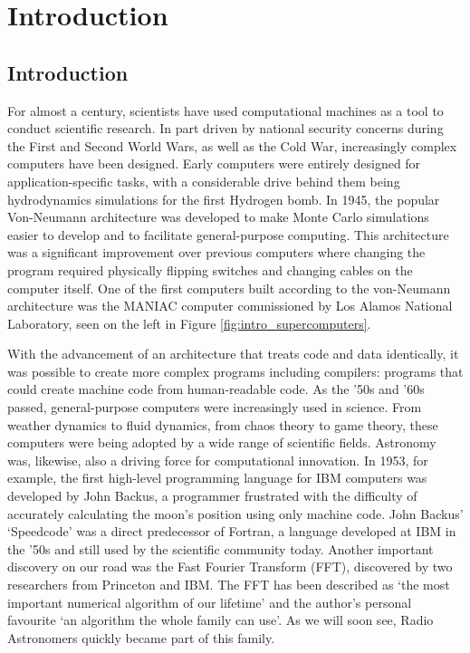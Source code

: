 \chapter{Introduction}

\section{Introduction}\label{sec:intro_intro}

For almost a century, scientists have used computational machines as a tool to conduct scientific research. In part driven by national security concerns during the First and Second World Wars, as well as the Cold War, increasingly complex computers have been designed. Early computers were entirely designed for application-specific tasks, with a considerable drive behind them being hydrodynamics simulations for the first Hydrogen bomb. In 1945, the popular Von-Neumann\citep{Neumann:1945:FDR:1102046} architecture was developed to make Monte Carlo simulations easier to develop and to facilitate general-purpose computing. This architecture was a significant improvement over previous computers where changing the program required physically flipping switches and changing cables on the computer itself. One of the first computers built according to the von-Neumann architecture was the MANIAC\citep{wood1985early} computer commissioned by Los Alamos National Laboratory, seen on the left in Figure \ref{fig:intro_supercomputers}.

With the advancement of an architecture that treats code and data identically, it was possible to create more complex programs including compilers: programs that could create machine code from human-readable code. As the '50s and '60s passed, general-purpose computers were increasingly used in science. From weather dynamics\citep{lorenz1956empirical} to fluid dynamics\citep{harlow1965numerical}, from chaos theory to game theory, these computers were being adopted by a wide range of scientific fields. Astronomy was, likewise, also a driving force for computational innovation. In 1953, for example, the first high-level programming language for IBM computers was developed by John Backus, a programmer frustrated with the difficulty of accurately calculating the moon's position using only machine code. John Backus' `Speedcode' was a direct predecessor of Fortran\citep{allen1981history}, a language developed at IBM in the '50s and still used by the scientific community today. Another important discovery on our road was the Fast Fourier Transform (FFT), discovered by two researchers from Princeton and IBM\citep{bingham1967modern}. The FFT has been described as `the most important numerical algorithm of our lifetime' and the author's personal favourite `an algorithm the whole family can use'\citep{top_10_algos}. As we will soon see, Radio Astronomers quickly became part of this family.


